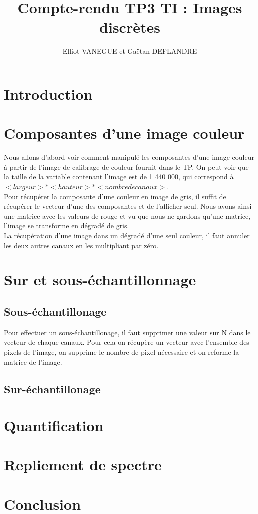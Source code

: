 \documentclass[a4paper,11pt]{article}
\title{Compte-rendu TP3 TI : Images discrètes}
\author{Elliot VANEGUE et Gaëtan DEFLANDRE}
\begin{document}


  \maketitle
  
  \mbox{}
  \newpage
  \clearpage
  
  \section*{Introduction}
  
  \section{Composantes d'une image couleur}
  Nous allons d'abord voir comment manipulé les composantes d'une image couleur à partir de l'image de calibrage
  de couleur fournit dans le TP. On peut voir que la taille de la variable contenant l'image est de 1 440 000,
  qui correspond à $<largeur> * <hauteur> * <nombre de canaux>$.\\
  
  Pour récupérer la composante d'une couleur en image de gris, il suffit de récupérer le vecteur d'une des composantes
  et de l'afficher seul. Nous avons ainsi une matrice avec les valeurs de rouge et vu que nous ne gardons qu'une matrice,
  l'image se transforme en dégradé de gris.\\
  
  
  La récupération d'une image dans un dégradé d'une seul couleur, il faut annuler les deux autres canaux en les multipliant par
  zéro.
  
  \section{Sur et sous-échantillonnage}
  \subsection{Sous-échantillonage}
  Pour effectuer un sous-échantillonage, il faut supprimer une valeur sur N dans le vecteur de chaque canaux.
  Pour cela on récupère un vecteur avec l'ensemble des pixels de l'image, on supprime le nombre de pixel nécessaire
  et on reforme la matrice de l'image.\\
  
  \subsection{Sur-échantillonage}
  \section{Quantification}
  \section{Repliement de spectre}
  
  \section*{Conclusion}
 
    
\end{document}
